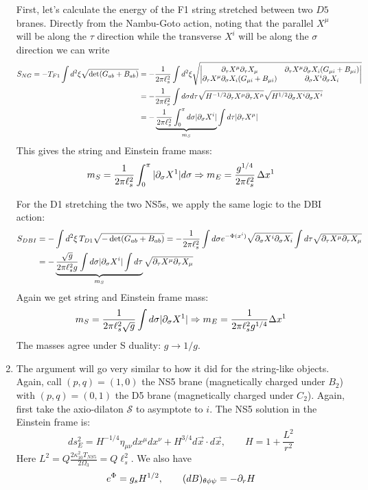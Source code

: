 \documentclass[11pt, class=article, crop=false]{standalone}
\begin{document}
\begin{enumerate}
	First, let's calculate the energy of the F1 string stretched between two $D5$ branes. %
	Directly from the Nambu-Goto action, noting that the parallel $X^\mu$ will be along the $\tau$ direction while the transverse $X^i$ will be along the $\sigma$ direction we can write 
	\[
	\begin{aligned}
		S_{NG} = -T_{F1} \int d^2 \xi \sqrt{\det(G_{ab} + B_{ab})} &= -\frac{1}{2\pi \ell_s^2} \int d^2 \xi \sqrt{\begin{vmatrix}
			\partial_\tau X^\mu \partial_\tau X_\mu & \partial_\tau X^\mu \partial_\sigma X_i (G_{\mu i} + B_{\mu i})\\
			\partial_\tau X^\mu \partial_\sigma X_i (G_{\mu i} + B_{\mu i}) & \partial_\sigma X^i \partial_\sigma X_i
		\end{vmatrix}}\\
		&= -\frac{1}{2\pi \ell_s^2} \int d \sigma d\tau \sqrt{H^{-1/2} \partial_\tau X^\mu \partial_\tau X^\mu} \sqrt{H^{1/2} \partial_\sigma X^i \partial_\sigma X^i} \\
		&= -\underbrace{\frac{1}{2\pi \ell_s^2} \int_0^\pi d\sigma |\partial_\sigma X^i|}_{m_S} \int d\tau |\partial_\tau X^\mu| 
	\end{aligned}
	\]
	This gives the string and Einstein frame mass:
	\[
		m_S = \frac{1}{2\pi \ell_s^2} \int_0^\pi |\partial_\sigma X^1| d\sigma \Rightarrow m_E = \frac{g^{1/4}}{2\pi \ell_s^2} \, \Delta x^1
	\]
	
	For the D1 stretching the two NS5s, we apply the same logic to the DBI action:
	\[
	\begin{aligned}
		S_{DBI} &= -\int d^2 \xi\, T_{D1} \sqrt{-\det(G_{ab} + B_{ab})} = - \frac{1}{2\pi \ell_s^2}  \int d\sigma e^{-\Phi(x^i)} \sqrt{\partial_\sigma X^i \partial_\sigma X_i}  \int d\tau  \sqrt{\partial_\tau X^\mu \partial_\tau X_\mu}\\
		&= - \underbrace{\frac{\sqrt{g}}{2\pi \ell_s^2 g} \int d\sigma |\partial_\sigma X^i| \int d\tau}_{m_S}  \sqrt{\partial_\tau X^\mu \partial_\tau X_\mu}
	\end{aligned}
	\] 
	Again we get string and  Einstein frame mass: 
	\[
		m_S = \frac{1}{2\pi \ell_s^2 \sqrt g} \int d\sigma |\partial_\sigma X^1| \Rightarrow m_E = \frac{1}{2 \pi \ell_s^2 g^{1/4}} \Delta x^1
	\]
	The masses agree under S duality: $g \to 1/g$.
	
	\item The argument will go very similar to how it did for the string-like objects. Again, call $(p,q) = (1,0)$ the NS5 brane (magnetically charged under $B_2$) with $(p,q) = (0,1)$ the D5 brane (magnetically charged under $C_2$). Again, first take the axio-dilaton $\mathcal S$ to asymptote to $i$. The NS5 solution in the Einstein frame is:
	\[
		ds_E^2 = H^{-1/4} \eta_{\mu \nu} dx^\mu  dx^\nu + H^{3/4} d\vec x \cdot d\vec x, \qquad H = 1 + \frac{L^2}{r^2}
	\]
	Here $L^2 = Q \frac{2 \kappa^2_{10} T_{NS5}}{2 \Omega_3} = Q \ell_s^2$. We also have
	\[
		e^{\Phi} = g_s H^{1/2}, \qquad (dB)_{\theta \phi \psi} = -\partial_r H
	\]
	

\end{enumerate}
\end{document}

